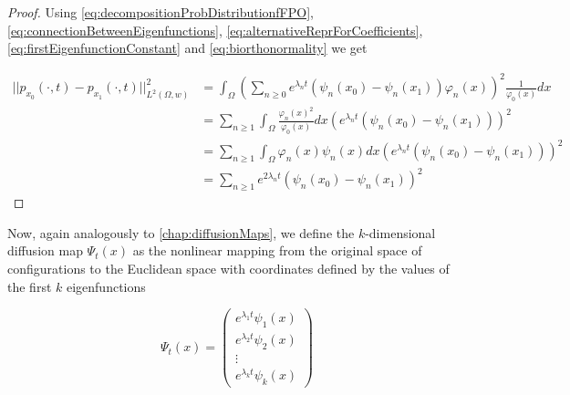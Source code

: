 \begin{proof}
Using \eqref{eq:decompositionProbDistributionfFPO}, \eqref{eq:connectionBetweenEigenfunctions}, \eqref{eq:alternativeReprForCoefficients}, \eqref{eq:firstEigenfunctionConstant} and \eqref{eq:biorthonormality} we get

\begin{equation*}\begin{aligned}
||p_{x_0}(\cdot, t) - p_{x_1}(\cdot, t) ||_{L^2(\Omega, w)}^2 &=
\int_\Omega \left( \sum_{n\geq 0} e^{\lambda_n t}(\psi_n(x_0)-\psi_n(x_1)) \varphi_n(x)\right)^2\frac{1}{\varphi_0(x)}dx\\
&= \sum_{n\geq 1} \int_\Omega \frac{\varphi_n(x)^2}{\varphi_0(x)}dx \left(e^{\lambda_n t}(\psi_n(x_0)-\psi_n(x_1))\right)^2\\
&= \sum_{n\geq 1} \int_\Omega \varphi_n(x)\psi_n(x)dx \left(e^{\lambda_n t}(\psi_n(x_0)-\psi_n(x_1))\right)^2\\
&= \sum_{n\geq 1} e^{2 \lambda_n t}(\psi_n(x_0)-\psi_n(x_1))^2
\end{aligned}\end{equation*}
\end{proof}

Now, again analogously to \autoref{chap:diffusionMaps}, we define the $k$-dimensional diffusion map $\Psi_t(x)$ as the nonlinear mapping from the original space of configurations to the Euclidean space with coordinates defined by the values of the first $k$ eigenfunctions

\begin{definition}

\begin{equation*}
\Psi_t(x)=\begin{pmatrix}
  e^{\lambda_1 t}\psi_1(x) \\
  e^{\lambda_2 t}\psi_2(x) \\
  \vdots \\
  e^{\lambda_k t}\psi_k(x)
 \end{pmatrix}
\end{equation*}

\end{definition}












